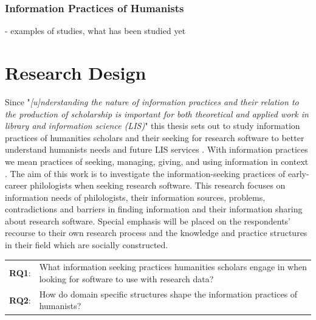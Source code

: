 \documentclass[12pt,a4paper,titlepage,oneside,abstract=true,toc=listof,toc=bibliography]{scrreprt}
\begin{document}
\subsection{Information Practices of Humanists}
- examples of studies, what has been studied yet
	
\chapter{Research Design}
Since "\textit{[u]nderstanding the nature of information practices and their relation to the production of scholarship is important for both theoretical and applied work in library and information science (LIS)}" \citep[p. 165]{Palmer2009} this thesis sets out to study information practices of humanities scholars and their seeking for research software to better understand humanists needs and future LIS services \citep{Case2008, Cunningham2010}. With information practices we mean practices of seeking, managing, giving, and using information in context \citep{Palmer2009}. The aim of this work is to investigate the information-seeking practices of early-career philologists when seeking research software. This research focuses on information needs of philologists, their information sources, problems, contradictions and barriers in finding information and their information sharing about research software. Special emphasis will be placed on the respondents' recourse to their own research process and the knowledge and practice structures in their field \citep{Hjorland1995} which are socially constructed.\\

\begin{tabular}{p{2cm}p{12cm}}
\textbf{RQ1}: & What information seeking practices humanities scholars engage in when looking for software to use with research data? \\ 
\textbf{RQ2}: & How do domain specific structures shape the information practices of humanists? \\ 
\end{tabular}\\ 
\end{document}
